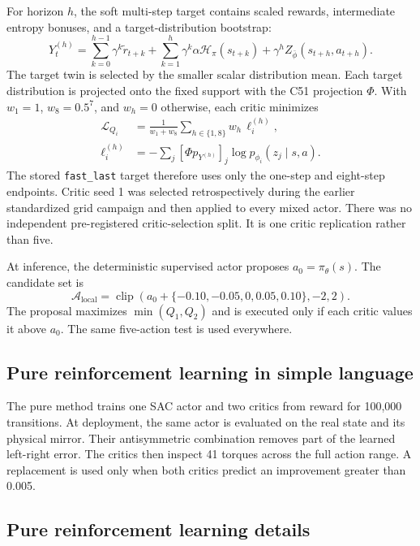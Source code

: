 \documentclass[10pt,twocolumn]{article}
\begin{document}
For horizon $h$, the soft multi-step target contains scaled rewards, intermediate entropy bonuses, and a target-distribution bootstrap:
\[
Y_t^{(h)}=\sum_{k=0}^{h-1}\gamma^k\widetilde r_{t+k}
+\sum_{k=1}^{h}\gamma^k\alpha\mathcal{H}_{\pi}(s_{t+k})
+\gamma^h Z_{\bar\phi}(s_{t+h},a_{t+h}).
\]
The target twin is selected by the smaller scalar distribution mean. Each target distribution is projected onto the fixed support with the C51 projection $\Phi$. With $w_1=1$, $w_8=0.5^7$, and $w_h=0$ otherwise, each critic minimizes
\begin{align*}
\mathcal{L}_{Q_i}
&=\frac{1}{w_1+w_8}\sum_{h\in\{1,8\}}w_h\,\ell_i^{(h)},\\
\ell_i^{(h)}
&=-\sum_j [\Phi p_{Y^{(h)}}]_j\log p_{\phi_i}(z_j\mid s,a).
\end{align*}
The stored \texttt{fast\_last} target therefore uses only the one-step and eight-step endpoints. Critic seed 1 was selected retrospectively during the earlier standardized grid campaign and then applied to every mixed actor. There was no independent pre-registered critic-selection split. It is one critic replication rather than five.

At inference, the deterministic supervised actor proposes $a_0=\pi_\theta(s)$. The candidate set is
\[
\mathcal{A}_{\mathrm{local}}=
\operatorname{clip}\left(a_0+\{-0.10,-0.05,0,0.05,0.10\},-2,2\right).
\]
The proposal maximizes $\min(Q_1,Q_2)$ and is executed only if each critic values it above $a_0$. The same five-action test is used everywhere.

\subsection{Pure reinforcement learning in simple language}

The pure method trains one SAC actor and two critics from reward for 100,000 transitions. At deployment, the same actor is evaluated on the real state and its physical mirror. Their antisymmetric combination removes part of the learned left-right error. The critics then inspect 41 torques across the full action range. A replacement is used only when both critics predict an improvement greater than 0.005.

\subsection{Pure reinforcement learning details}
\end{document}
